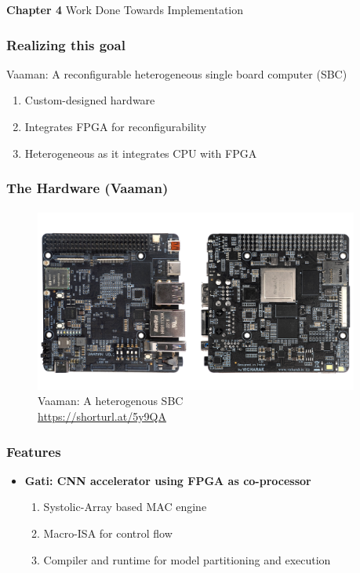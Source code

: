\documentclass{beamer}
\begin{document}
{\begin{frame}[c,fragile]
  \centering
  \textbf{Chapter 4}
  Work Done Towards Implementation
\end{frame}

\begin{frame}[fragile]
  \frametitle{Realizing this goal}
  Vaaman: A reconfigurable heterogeneous single board computer (SBC)
  \begin{enumerate}
\item Custom-designed hardware
\item Integrates FPGA for reconfigurability
\item Heterogeneous as it integrates CPU with FPGA
  \end{enumerate}
  \framesubtitle{}
\end{frame}

\begin{frame}[fragile]
  \frametitle{The Hardware (Vaaman)}
  \framesubtitle{}
  \begin{figure}
    \centering
    \includegraphics[width=0.95\textwidth]{vaaman.jpg}
    \caption{Vaaman: A heterogenous SBC \\ \url{https://shorturl.at/5y9QA}}
    \label{neuron}
  \end{figure}
  
\end{frame}

\begin{frame}[fragile]
  \frametitle{Features}
  \begin{itemize}
    \item \textbf{Gati: CNN accelerator using FPGA as co-processor}
      \begin{enumerate}
        \item Systolic-Array based MAC engine
        \item Macro-ISA for control flow
        \item Compiler and runtime for model partitioning and execution
      \end{enumerate}


\end{itemize}
\end{frame}}
\end{document}
